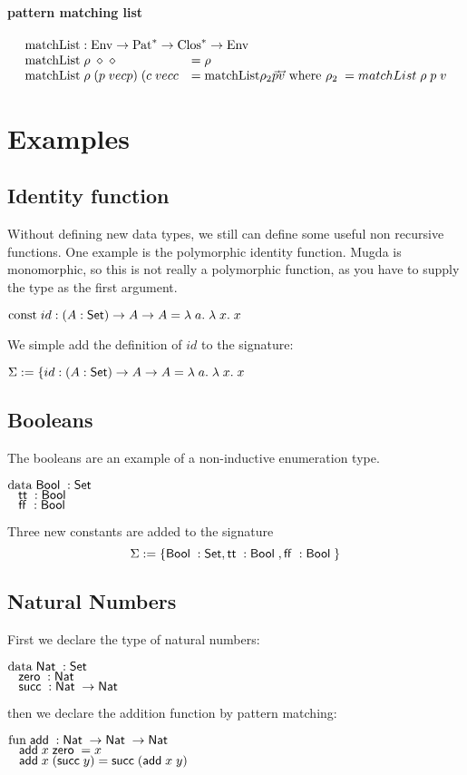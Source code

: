 \paragraph*{pattern matching list}
\[
\begin{array}{ll}
\multicolumn{2}{l}{\matchList : \Env \ra \ves{\Pat} \ra \ves{\Clos} \ra \Env }\\
\matchList \; \rho \; \diamond \; \diamond & = \rho \\
\matchList \; \rho \; (p \; vec{p}) \; (c \; vec{c} & = \matchList \rho_2 \vec{p} \vec{v} \mbox{ where } \rho_2 \; = matchList \; \rho \; p \; v \\
\end{array}
\]

\section{Examples}
\subsection{Identity function}
Without defining new data types, we still can define some useful non recursive functions.
One example is the polymorphic identity function. 
Mugda is monomorphic, so this is not really a polymorphic function, as you have to supply the
type as the first argument.
\begin{bsp}
$\mathrm{const}\; id : ( A : \mathsf{Set} ) \rightarrow{A \rightarrow A} = \lambda\; a .\;\lambda\; x .\;x$   
\end{bsp}
We simple add the definition of $id$ to the signature:
\begin{bsp}
$\mathrm{\Sigma} := \{ id : ( A : \mathsf{Set} ) \rightarrow{A \rightarrow A} = \lambda\; a .\;\lambda\; x .\;x$
\end{bsp}
\subsection{Booleans}
The booleans are an example of a non-inductive enumeration type.
\begin{bsp}
$\mathrm{data}\; \mathsf{Bool}\; : \mathsf{Set}$  \\
$\hspace*{3mm} \mathsf{tt}\; : \mathsf{Bool}\; $\\
$\hspace*{3mm} \mathsf{ff}\; : \mathsf{Bool}\; $
\end{bsp}
Three new constants are added to the signature
\[ \mathrm{\Sigma} := \{ \mathsf{Bool}\; : \mathsf{Set} , \mathsf{tt}\; : \mathsf{Bool}\; , \mathsf{ff}\; : \mathsf{Bool}\; \} \]
\subsection{Natural Numbers}
First we declare the type of natural numbers:
\begin{bsp}
$\mathrm{data}\; \mathsf{Nat}\; : \mathsf{Set}$ \\
$\hspace*{3mm} \mathsf{zero}\; : \mathsf{Nat}\; $\\
$\hspace*{3mm} \mathsf{succ}\; : \mathsf{Nat}\; \rightarrow \mathsf{Nat}\;$
\end{bsp}
then we declare the addition function by pattern matching:
\begin{bsp}
$\mathrm{fun}\; \mathsf{add}\; : \mathsf{Nat}\; \rightarrow \mathsf{Nat}\; \rightarrow \mathsf{Nat}\;$\\
$\hspace*{3mm} \mathsf{add}\; x \; \mathsf{zero}\; = x $\\
$\hspace*{3mm} \mathsf{add}\; x \; (\mathsf{succ}\; y) = \mathsf{succ}\; (\mathsf{add}\; x \; y)  $
\end{bsp}
